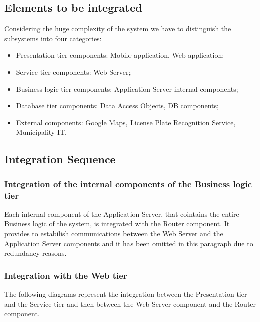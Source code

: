\documentclass[../DD.tex]{subfiles}
\begin{document}
\subsection{Elements to be integrated}
Considering the huge complexity of the system we have to distinguish the subsystems into four categories:
\begin{itemize}
	\item{Presentation tier components:} Mobile application, Web application;
	\item{Service tier components:} Web Server;
	\item{Business logic tier components:} Application Server internal components;
	\item{Database tier components:} Data Access Objects, DB components;
	\item{External components}: Google Maps, License Plate Recognition Service, Municipality IT.
\end{itemize}

\subsection{Integration Sequence}
\subsubsection{Integration of the internal components of the Business logic tier}
Each internal component of the Application Server, that cointains the entire Business logic of the system, is integrated with the Router component. It provides to estabilish communications between the Web Server and the Application Server components and it has been omitted in this paragraph due to redundancy reasons.


\subsubsection{Integration with the Web tier}
The following diagrams represent the integration between the Presentation tier and the Service tier and then between the Web Server component and the Router component.

\end{document}
